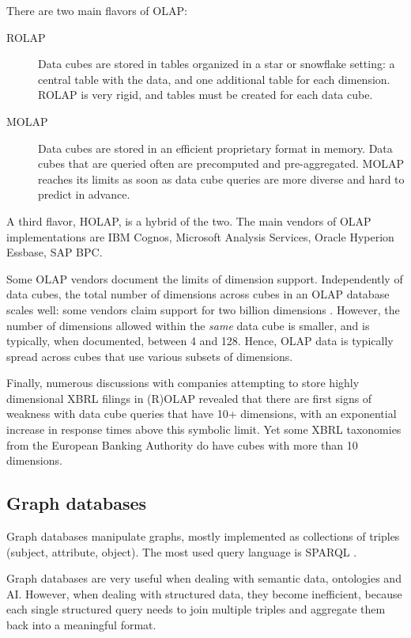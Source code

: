 \documentclass{acm_proc_article-sp}
\begin{document}
There are two main flavors of OLAP:
\begin{description}
\item[ROLAP] Data cubes are stored in tables organized in a star or snowflake setting: a central table with the data, and one additional table for each dimension. ROLAP is very rigid, and tables must be created for each data cube.
\item[MOLAP] Data cubes are stored in an efficient proprietary format in memory. Data cubes that are queried often are precomputed and pre-aggregated. MOLAP reaches its limits as soon as data cube queries are more diverse and hard to predict in advance.
\end{description}

A third flavor, HOLAP, is a hybrid of the two. The main vendors of OLAP implementations are IBM Cognos, Microsoft Analysis Services, Oracle Hyperion Essbase, SAP BPC.

Some OLAP vendors document the limits of dimension support. Independently of data cubes, the total number of dimensions across cubes in an OLAP database scales well: some vendors claim support for two billion dimensions \cite{AnalysisServicesLimit}. However, the number of dimensions allowed within the \emph{same} data cube is smaller, and is typically, when documented, between 4 and 128. Hence, OLAP data is typically spread across cubes that use various subsets of dimensions.

Finally, numerous discussions with companies attempting to store highly dimensional XBRL filings in (R)OLAP revealed that there are first signs of weakness with data cube queries that have 10+ dimensions, with an exponential increase in response times above this symbolic limit. Yet some XBRL taxonomies from the European Banking Authority \cite{DPM} do have cubes with more than 10 dimensions.

\subsection{Graph databases}

Graph databases manipulate graphs, mostly implemented as collections of triples (subject, attribute, object). The most used query language is SPARQL \cite{SPARQL}.

Graph databases are very useful when dealing with semantic data, ontologies and AI. However, when dealing with structured data, they become inefficient, because each single structured query needs to join multiple triples and aggregate them back into a meaningful format.
\end{document}
